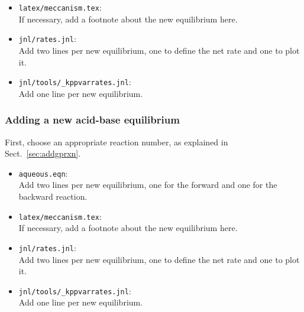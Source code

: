 \documentclass[twoside]{article}
\def\nosep{\setlength\parsep{0mm}\setlength\topsep{0mm}\setlength\itemsep{0mm}}
\begin{document}
\begin{itemize}\nosep
\item \verb|latex/meccanism.tex|:\\
  If necessary, add a footnote about the new equilibrium here.
\end{itemize}

\begin{itemize}\nosep
\item \verb|jnl/rates.jnl|:\\
  Add two lines per new equilibrium, one to define the net rate and one
  to plot it.
\end{itemize}

\begin{itemize}\nosep
\item \verb|jnl/tools/_kppvarrates.jnl|:\\
  Add one line per new equilibrium.
\end{itemize}

\subsubsection{Adding a new acid-base equilibrium}

First, choose an appropriate reaction number, as explained in
Sect.~\ref{sec:addgprxn}.

\begin{itemize}\nosep
\item \verb|aqueous.eqn|:\\
  Add two lines per new equilibrium, one for the forward and one for the
  backward reaction.
\end{itemize}

\begin{itemize}\nosep
\item \verb|latex/meccanism.tex|:\\
  If necessary, add a footnote about the new equilibrium here.
\end{itemize}

\begin{itemize}\nosep
\item \verb|jnl/rates.jnl|:\\
  Add two lines per new equilibrium, one to define the net rate and one
  to plot it.
\end{itemize}

\begin{itemize}\nosep
\item \verb|jnl/tools/_kppvarrates.jnl|:\\
  Add one line per new equilibrium.
\end{itemize}
\end{document}
